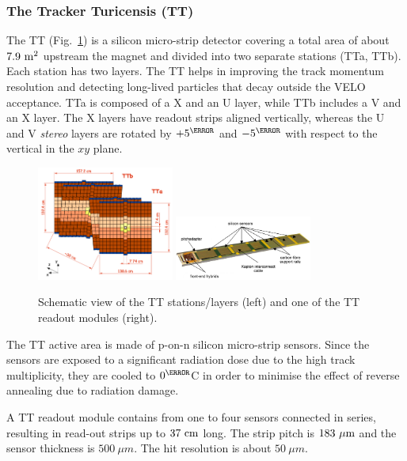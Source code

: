 \subsubsection*{The Tracker Turicensis (TT)}

The TT \cite{LHCb-TDR-009} (Fig.~\ref{fig:TT}) is a silicon micro-strip detector covering a total area of about $7.9~\rm m^2$ upstream the magnet and divided into two separate stations (TTa, TTb). Each station has two layers. The TT helps in improving the track momentum resolution and detecting long-lived particles that decay outside the VELO acceptance. TTa is composed of a X and an U layer, while TTb includes a V and an X layer. The X layers have readout strips aligned vertically, whereas the U and V \emph{stereo} layers are rotated by $+5^{\degree}$ and $-5^{\degree}$ with respect to the vertical in the $xy$ plane.

\begin{figure}[t]
  \begin{center}
    \includegraphics[width=0.4\textwidth]{02LHCb/figs/TT-scheme.png}
    \includegraphics[width=0.4\textwidth]{02LHCb/figs/TT-strip-layout.png}
  \end{center}
  \vspace{-2mm}
  \caption{Schematic view of the TT stations/layers (left) and one of the TT readout modules (right).}
  \label{fig:TT}
\end{figure}


The TT active area is made of p-on-n silicon micro-strip sensors. Since the sensors are exposed to a significant radiation dose due to the high track multiplicity, they are cooled to $0^{\degree}$C in order to minimise the effect of reverse annealing due to radiation damage.

A TT readout module contains from one to four sensors connected in series, resulting in read-out strips up to $37~\rm cm$ long. The strip pitch is $183~\rm\mu m$ and the sensor thickness is $500~\mu m$. The hit resolution is about $50~\mu m$.

